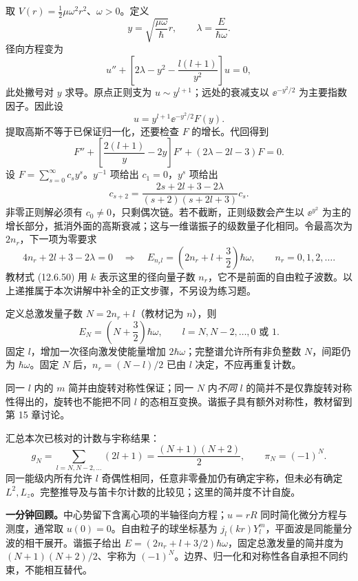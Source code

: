 取 $V(r)=\tfrac12\mu\omega^2r^2$、$\omega>0$。定义
\begin{equation}
  y=\sqrt{\frac{\mu\omega}{\hbar}}r,\qquad
  \lambda=\frac{E}{\hbar\omega}.
\end{equation}
径向方程变为
\begin{equation}
  u''+\left[2\lambda-y^2-\frac{l(l+1)}{y^2}\right]u=0,
\end{equation}
此处撇号对 $y$ 求导。原点正则支为 $u\sim y^{l+1}$；远处的衰减支以 $\ee^{-y^2/2}$ 为主要指数因子。因此设
\begin{equation}
  u=y^{l+1}\ee^{-y^2/2}F(y).
\end{equation}
提取高斯不等于已保证归一化，还要检查 $F$ 的增长。代回得到
\begin{equation}
  F''+\left[\frac{2(l+1)}y-2y\right]F'
      +(2\lambda-2l-3)F=0.
\end{equation}
设 $F=\sum_{s=0}^\infty c_sy^s$。$y^{-1}$ 项给出 $c_1=0$，$y^s$ 项给出
\begin{equation}
  \boxed{c_{s+2}=\frac{2s+2l+3-2\lambda}
    {(s+2)(s+2l+3)}c_s.}
\end{equation}
非零正则解必须有 $c_0\ne0$，只剩偶次链。若不截断，正则级数会产生以 $\ee^{y^2}$ 为主的增长部分，抵消外面的高斯衰减；这与一维谐振子的级数量子化相同。令最高次为 $2n_r$，下一项为零要求
\begin{equation}
  4n_r+2l+3-2\lambda=0
  \quad\Longrightarrow\quad
  \boxed{E_{n_rl}=\left(2n_r+l+\frac32\right)\hbar\omega,
  \qquad n_r=0,1,2,\ldots.}
\end{equation}
教材式 (12.6.50) 用 $k$ 表示这里的径向量子数 $n_r$，它不是前面的自由粒子波数。以上递推属于本次讲解中补全的正文步骤，不另设为练习题。

定义总激发量子数 $N=2n_r+l$（教材记为 $n$），则
\begin{equation}
  \boxed{E_N=\left(N+\frac32\right)\hbar\omega,
  \qquad l=N,N-2,\ldots,0\text{ 或 }1.}
\end{equation}
固定 $l$，增加一次径向激发使能量增加 $2\hbar\omega$；完整谱允许所有非负整数 $N$，间距仍为 $\hbar\omega$。固定 $N$ 后，$n_r=(N-l)/2$ 已由 $l$ 决定，不应再重复计数。

同一 $l$ 内的 $m$ 简并由旋转对称性保证；同一 $N$ 内\emph{不同} $l$ 的简并不是仅靠旋转对称性得出的，旋转也不能把不同 $l$ 的态相互变换。谐振子具有额外对称性，教材留到第 15 章讨论。

汇总本次已核对的计数与宇称结果：
\begin{equation}
  \boxed{g_N=\sum_{l=N,N-2,\ldots}(2l+1)
    =\frac{(N+1)(N+2)}2,\qquad \pi_N=(-1)^N.}
\end{equation}
同一能级内所有允许 $l$ 奇偶性相同，任意非零叠加仍有确定宇称，但未必有确定 $L^2,L_z$。完整推导及与笛卡尔计数的比较见；这里的简并度不计自旋。

\textbf{一分钟回顾。}中心势留下含离心项的半轴径向方程；$u=rR$ 同时简化微分方程与测度，通常取 $u(0)=0$。自由粒子的球坐标基为 $j_l(kr)Y_l^m$，平面波是同能量分波的相干展开。谐振子给出 $E=(2n_r+l+3/2)\hbar\omega$，固定总激发量的简并度为 $(N+1)(N+2)/2$、宇称为 $(-1)^N$。边界、归一化和对称性各自承担不同约束，不能相互替代。
